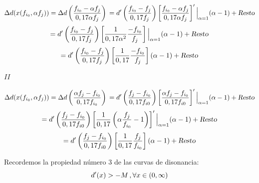 \documentclass[11pt,a4paper]{article}
\begin{document}
	\begin{equation*}
	    \Delta d (x (f_{i_0}, \alpha f_j)) 
	    = \Delta d \left( \frac{f_{i_0} - \alpha f_j}{0,17 \alpha f_j} \right)\\
	    = d'\left( \frac{f_{i_0}-f_j}{0,17 f_j} \right) \left[  \frac{f_{i_0} - \alpha f_j}{0,17 \alpha f_j}  \right]' \Big|_{\alpha = 1}  (\alpha -1) + \textnormal{\textsl{Resto}}\\
	\end{equation*}
	\begin{equation*}
	    = d' \left( \frac{f_{i_0}-f_j}{0,17 f_j} \right) \left[  \frac{1}{0,17 \alpha^2} \frac{-f_{i_0}}{f_j}  \right] \Big|_{\alpha = 1}  (\alpha -1) + \textnormal{\textsl{Resto}}
	\end{equation*}
	\begin{equation}
	    = d' \left( \frac{f_{i_0}-f_j}{0,17 f_j} \right) \left[  \frac{1}{0,17} \frac{-f_{i_0}}{f_j}  \right]  (\alpha -1) + \textnormal{\textsl{Resto}}
	\end{equation}
	
	$ \boxed{II} $ 
	
	\begin{equation*}
	    \Delta d (x (f_{i_0}, \alpha f_j))
	    = \Delta d \left( \frac{\alpha f_j - f_{i_0}}{0,17 f_{i_0}} \right)\\
	    = d' \left( \frac{f_j - f_{i_0}}{0,17 f_{i0}} \right) \left[ \frac{\alpha f_j - f_{i_0}}{0,17 f_{i0}} \right]' \Big|_{\alpha = 1} (\alpha -1) + \textnormal{\textsl{Resto}}\\
    \end{equation*}
    \begin{equation*}
	    = d' \left( \frac{f_j - f_{i_0}}{0,17 f_{i0}} \right) \left[ \frac{1}{0,17} \left( \alpha \frac{f_j}{f_{i_0}} - 1 \right)  \right]' \Big|_{\alpha = 1}  (\alpha -1) + \textnormal{\textsl{Resto}}
	\end{equation*}
	\begin{equation}
	   = d' \left( \frac{f_j - f_{i_0}}{0,17 f_{i0}} \right) \left[ \frac{1}{0,17} \frac{f_j}{f_{i_0}}\right] (\alpha -1) + \textnormal{\textsl{Resto}}
	\end{equation}
	
	
	Recordemos la propiedad número $3$ de las curvas de disonancia:
	\begin{equation*}
	    d'(x) > - M \, \textnormal{,} \, \forall x \in (0, \infty)
	\end{equation*}
	
\end{document}
